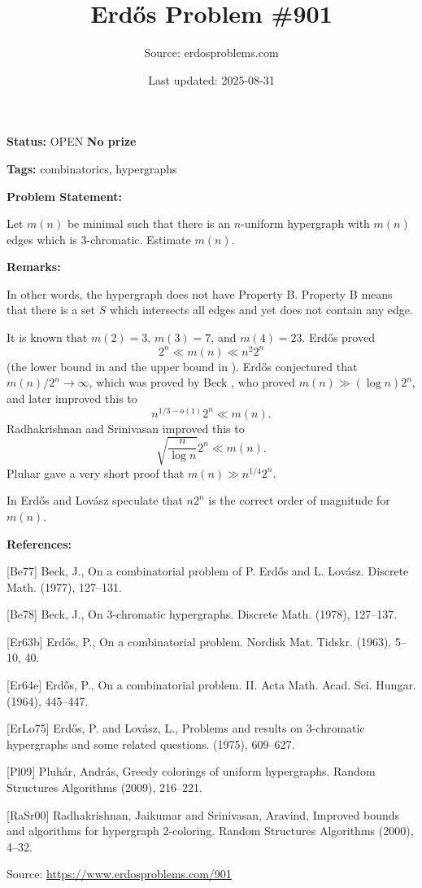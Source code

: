 \documentclass{article}
\title{Erd\H{o}s Problem \#901}
\date{Last updated: 2025-08-31}
\author{Source: erdosproblems.com}
\begin{document}
\maketitle

\noindent\textbf{Status:} OPEN \quad \textbf{No prize}

\noindent\textbf{Tags:} combinatorics, hypergraphs

\medskip
\noindent\textbf{Problem Statement:}

Let $m(n)$ be minimal such that there is an $n$-uniform hypergraph with $m(n)$ edges which is $3$-chromatic. Estimate $m(n)$.

\bigskip
\noindent\textbf{Remarks:}

In other words, the hypergraph does not have Property B. Property B means that there is a set $S$ which intersects all edges and yet does not contain any edge.

It is known that $m(2)=3$, $m(3)=7$, and $m(4)=23$. Erd\H{o}s proved\[2^n \ll m(n) \ll n^2 2^n\](the lower bound in \cite{Er63b} and the upper bound in \cite{Er64e}). Erd\H{o}s conjectured that $m(n)/2^n\to \infty$, which was proved by Beck \cite{Be77}, who proved $m(n)\gg (\log n)2^n$, and later \cite{Be78} improved this to\[n^{1/3-o(1)}2^n \ll m(n).\]Radhakrishnan and Srinivasan \cite{RaSr00} improved this to\[\sqrt{\frac{n}{\log n}}2^n \ll m(n).\]Pluhar \cite{Pl09} gave a very short proof that $m(n) \gg n^{1/4}2^n$.

In \cite{ErLo75} Erd\H{o}s and Lov\'{a}sz speculate that $n2^n$ is the correct order of magnitude for $m(n)$.

\bigskip
\noindent\textbf{References:}

[Be77] Beck, J., On a combinatorial problem of {P}. {E}rd\H{o}s and {L}.
{L}ov\'{a}sz. Discrete Math. (1977), 127--131.
 
 [Be78] Beck, J., On {$3$}-chromatic hypergraphs. Discrete Math. (1978), 127--137.
 
 [Er63b] Erd\H{o}s, P., On a combinatorial problem. Nordisk Mat. Tidskr. (1963), 5--10, 40.
 
 [Er64e] Erd\H{o}s, P., On a combinatorial problem. {II}. Acta Math. Acad. Sci. Hungar. (1964), 445--447.
 
 [ErLo75] Erd\H{o}s, P. and Lov\'{a}sz, L., Problems and results on {$3$}-chromatic hypergraphs and some
related questions. (1975), 609--627.
 
 [Pl09] Pluh\'{a}r, Andr\'{a}s, Greedy colorings of uniform hypergraphs. Random Structures Algorithms (2009), 216--221.
 
 [RaSr00] Radhakrishnan, Jaikumar and Srinivasan, Aravind, Improved bounds and algorithms for hypergraph {$2$}-coloring. Random Structures Algorithms (2000), 4--32.

\bigskip
\noindent\small{Source: \url{https://www.erdosproblems.com/901}}
\end{document}
